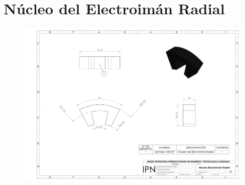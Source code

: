 \chapter{N\'ucleo del Electroim\'an Radial}

\newpage

\begin{figure}[t]
\centering
	\includegraphics[width=\textheight, height=\textwidth, angle=270]{images/Apendices/Plano_Nucleo}
\end{figure}